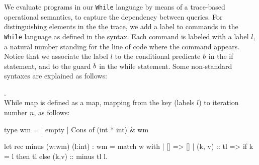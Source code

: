 \documentclass[a4paper,11pt]{article}
\begin{document}
{
We evaluate programs in our {\tt While} language by means of a trace-based operational semantics, to capture the dependency between queries. For distinguishing elements in the the trace, we add a label to commands in the {\tt While} language as defined in the syntax.
%
Each command is labeled with a label $l$, a natural number standing for the line of code where the command appears. Notice that we associate the label $l$ to the conditional predicate $b$ in the if statement, and to the guard $b$ in the while statement. Some non-standard syntaxes are explained as follows:  
%
  	\begin{defn}.
  	\\
  	While map is defined as a map, mapping from the key (labels $l$) to iteration number $n$, as follows:
	\begin{ocaml}{}
	type wm = | empty 
	          | Cons of (int * int) & wm

	let rec  minus (w:wm) (l:int) : wm = 
	    match w with 
	       | [] => []
	       | (k, v) :: tl => 
	        if k = l then tl else (k,v) :: minus tl l.   


\end{ocaml}
\end{defn}}
\end{document}
